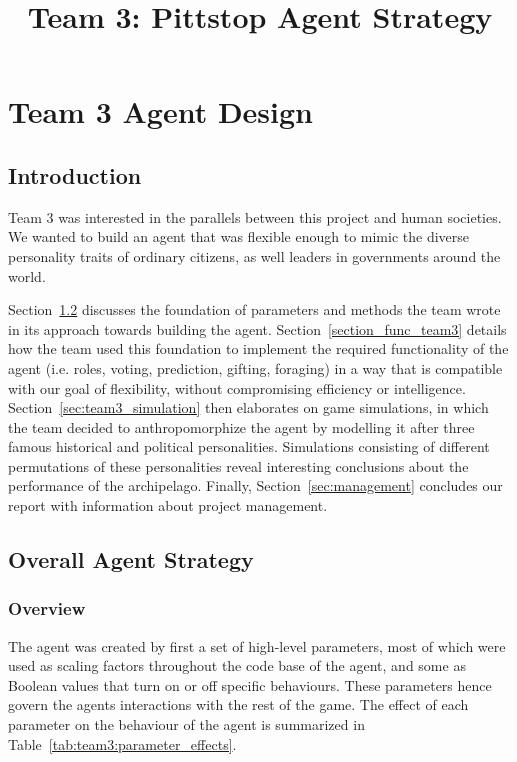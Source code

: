 \chapter{Team 3 Agent Design}

\title{Team 3: Pittstop Agent Strategy}

\maketitle

\section{Introduction}

Team 3 was interested in the parallels between this project and human societies. We wanted to build an agent that was flexible enough to mimic the diverse personality traits of ordinary citizens, as well leaders in governments around the world.

Section~\ref{sec:overall_strat} discusses the foundation of parameters and methods the team wrote in its approach towards building the agent. Section~\ref{section_func_team3} details how the team used this foundation to implement the required functionality of the agent (i.e. roles, voting, prediction, gifting, foraging) in a way that is compatible with our goal of flexibility, without compromising efficiency or intelligence. Section~\ref{sec:team3_simulation} then elaborates on game simulations, in which the team decided to anthropomorphize the agent by modelling it after three famous historical and political personalities. Simulations consisting of different permutations of these personalities reveal interesting conclusions about the performance of the archipelago. Finally, Section~\ref{sec:management} concludes our report with information about project management.

\section{Overall Agent Strategy}
\label{sec:overall_strat}

\subsection{Overview}
\label{sec:overview}


The agent was created by first a set of high-level parameters, most of which were used as scaling factors throughout the code base of the agent, and some as Boolean values that turn on or off specific behaviours. These parameters hence govern the agents interactions with the rest of the game. The effect of each parameter on the behaviour of the agent is summarized in Table~\ref{tab:team3:parameter_effects}. \\


